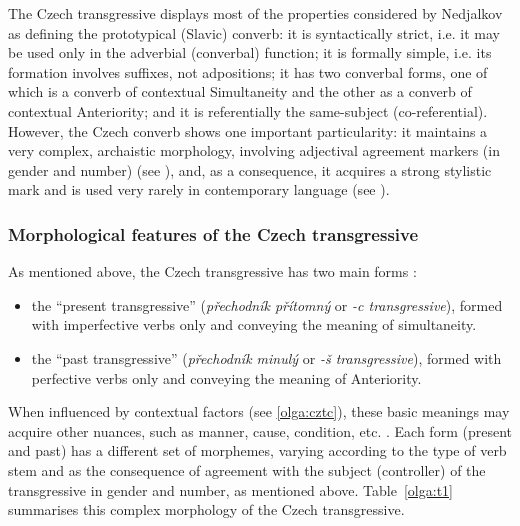 \documentclass[output=paper,russian]{langsci/langscibook}
\begin{document}
The Czech transgressive displays most of the properties considered by Nedjalkov as defining the prototypical (Slavic) converb: it is syntactically strict, i.e. it may be used only in the adverbial (converbal) function; it is formally simple, i.e. its formation involves suffixes, not adpositions; it has two converbal forms, one of which is a converb of contextual Simultaneity and the other as a converb of contextual Anteriority; and it is referentially the same-subject (co-referential). However, the Czech converb shows one important particularity: it maintains a very complex, archaistic morphology, involving adjectival agreement markers (in gender and number) (see ), and, as a consequence, it acquires a strong stylistic mark and is used very rarely in contemporary language (see ).

\subsubsection{Morphological features of the Czech transgressive}\label{olga:mor}

As mentioned above, the Czech transgressive has two main forms \parencite{karlik17}: 

\begin{itemize}
  \item the \enquote{present transgressive} (\textit{přechodník přítomný} or \textit{-c transgressive}), formed with imperfective verbs only and conveying the meaning of simultaneity.
  \item the \enquote{past transgressive} (\textit{přechodník minulý} or \textit{-š transgressive}), formed with perfective verbs only and conveying the meaning of Anteriority.
\end{itemize}

When influenced by contextual factors (see \ref{olga:cztc}), these basic meanings may acquire other nuances, such as manner, cause, condition, etc. \parencite[33]{dvorak83}. Each form (present and past) has a different set of morphemes, varying according to the type of verb stem and as the consequence of agreement with the subject (controller) of the transgressive in gender and number, as mentioned above. Table~\ref{olga:t1} summarises this complex morphology of the Czech transgressive.
\end{document}
